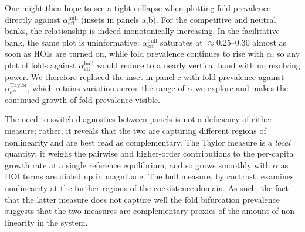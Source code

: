 \documentclass[pdflatex,sn-mathphys-num]{sn-jnl}%
\begin{document}
One might then hope to see a tight collapse when plotting fold prevalence directly against $\alpha^{\mathrm{hull}}_{\mathrm{eff}}$ (insets in panels a,b). For the competitive and neutral banks, the relationship is indeed monotonically increasing. In the facilitative bank, the same plot is uninformative: $\alpha^{\mathrm{hull}}_{\mathrm{eff}}$ saturates at $\approx 0.25$--$0.30$ almost as soon as HOIs are turned on, while fold prevalence continues to rise with $\alpha$, so any plot of folds against $\alpha^{\mathrm{hull}}_{\mathrm{eff}}$ would reduce to a nearly vertical band with no resolving power. We therefore replaced the inset in panel c with fold prevalence against $\alpha^{\mathrm{Taylor}}_{\mathrm{eff}}$, which retains variation across the range of $\alpha$ we explore and makes the continued growth of fold prevalence visible.

The need to switch diagnostics between panels is not a deficiency of either measure; rather, it reveals that the two are capturing different regions of nonlinearity and are best read as complementary. The Taylor measure is a \emph{local} quantity: it weighs the pairwise and higher-order contributions to the per-capita growth rate at a single reference equilibrium, and so grows smoothly with $\alpha$ as HOI terms are dialed up in magnitude. The hull measure, by contrast, examines nonlinearity at the further regions of the coexistence domain. As such, the fact that the latter measure does not capture well the fold bifurcation prevalence suggests that the two measures are complementary proxies of the amount of non linearity in the system.
\end{document}
